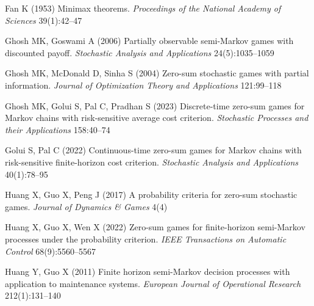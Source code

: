 \documentclass[12pt]{article}
\begin{document}
\begin{thebibliography}{}
Fan K (1953) Minimax theorems. \textit{Proceedings of the National Academy of
	Sciences} 39(1):42--47


Ghosh MK, Goswami A (2006) {Partially observable semi-Markov games with
	discounted payoff}. \textit{Stochastic Analysis and Applications}
24(5):1035--1059

Ghosh MK, McDonald D, Sinha S (2004) Zero-sum stochastic games with partial
information. \textit{Journal of Optimization Theory and Applications}
121:99--118

Ghosh MK, Golui S, Pal C, Pradhan S (2023) {Discrete-time zero-sum games for
	Markov chains with risk-sensitive average cost criterion}. \textit{Stochastic
	Processes and their Applications} 158:40--74

Golui S, Pal C (2022) {Continuous-time zero-sum games for Markov chains with
	risk-sensitive finite-horizon cost criterion}. \textit{Stochastic Analysis
	and Applications} 40(1):78--95



Huang X, Guo X, Peng J (2017) A probability criteria for zero-sum stochastic
games. \textit{Journal of Dynamics \& Games} 4(4)

Huang X, Guo X, Wen X (2022) {Zero-sum games for finite-horizon semi-Markov
	processes under the probability criterion}. \textit{IEEE Transactions on
	Automatic Control} 68(9):5560--5567

Huang Y, Guo X (2011) {Finite horizon semi-Markov decision processes with
	application to maintenance systems}. \textit{European Journal of Operational
	Research} 212(1):131--140


\end{thebibliography}
\end{document}
